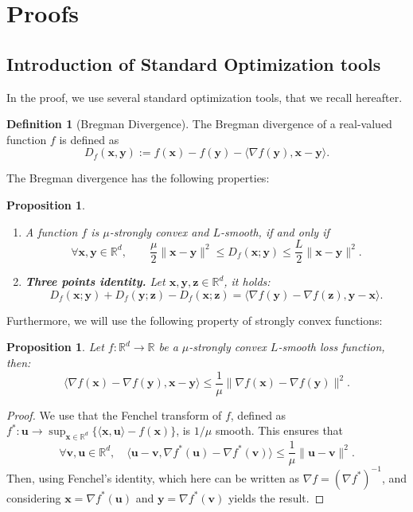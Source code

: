 \documentclass{article}
\def\vu{{\bm{u}}}
\def\vv{{\bm{v}}}
\def\vx{{\bm{x}}}
\def\vy{{\bm{y}}}
\def\vz{{\bm{z}}}
\newcommand{\R}{\mathbb{R}}
\theoremstyle{plain}
\newtheorem{proposition}[theorem]{Proposition}
\theoremstyle{definition}
\newtheorem{definition}[theorem]{Definition}
\theoremstyle{remark}
\begin{document}
\section{Proofs}
\label{app:proofs}
\subsection{Introduction of Standard Optimization tools}
\label{app:proofs_standard_tools}
In the proof, we  use several standard optimization tools, that we recall hereafter.
\begin{definition}[Bregman Divergence]
    The Bregman divergence of a real-valued function $f$ is defined as 
    \[
    D_f(\vx,\vy) := f(\vx) - f(\vy) - \langle \nabla f(\vy), \vx - \vy \rangle.
    \]
\end{definition}
The Bregman divergence has the following properties:
\begin{proposition}
    \begin{enumerate}
        \item A function $f$ is $\mu$-strongly convex and $L$-smooth, if and only if
        \begin{equation}
        \label{app:eq:smoothness_strongcvx_bregman}
        \forall \vx,\vy \in \R^d, \qquad \frac{\mu}{2}\|\vx - \vy\|^2 \le D_f(\vx;\vy) \le \frac{L}{2}\|\vx-\vy\|^2.
        \end{equation}
        \item \textbf{Three points identity.} Let $\vx,\vy,\vz \in \R^d$, it holds:
        \begin{equation}
        \label{app:eq:three_points_identity}
        D_{f}(\vx;\vy) + D_{f}(\vy;\vz) - D_{f}(\vx;\vz) = \langle  \nabla f(\vy) - \nabla f(\vz), \vy - \vx\rangle.
        \end{equation}
    \end{enumerate}
\end{proposition}

Furthermore, we will  use the following property of strongly convex functions:

\begin{proposition}
    Let $f:\R^d \rightarrow \R$ be a $\mu$-strongly convex $L$-smooth loss function, then:
    \begin{equation}
        \label{app:eq:cocoaxivity_strong_convexity}
            \langle\nabla f(\vx) - \nabla f(\vy), \vx - \vy\rangle \le \frac{1}{\mu}\|\nabla f(\vx) - \nabla f(\vy)\|^2.
        \end{equation}
\end{proposition}
\begin{proof}
        We use that the Fenchel transform of $f$, defined as $f^*:\vu \rightarrow \sup_{\vx \in \R^d}\{\langle \vx,\vu\rangle - f(\vx)\}$, is $1/\mu$ smooth. 
        This ensures that 
        \[
        \forall \vv, \vu \in \R^d,\quad \langle \vu - \vv, \nabla f^*(\vu) - \nabla f^*(\vv)\rangle \le \frac{1}{\mu}\|\vu - \vv\|^2.
        \]
        Then, using Fenchel's identity, which here can be written as $\nabla f = (\nabla f^*)^{-1}$, and considering $\vx = \nabla f^*(\vu)$ and $\vy = \nabla f^*(\vv)$ yields the result.
\end{proof}
\end{document}
